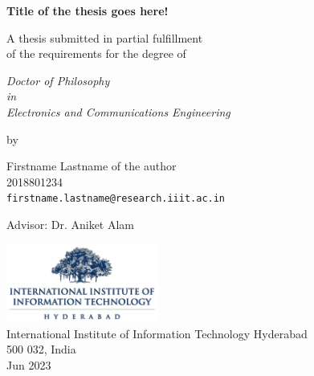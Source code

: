 \thispagestyle{empty}
\begin{center}
\vspace*{1.5cm}
{\Large \bf Title of the thesis goes here!}

\vspace*{2.2cm}
{\large A thesis submitted in partial fulfillment\\}
{\large  of the requirements for the degree of \\}

\vspace*{1cm}
{\it {\large Doctor of Philosophy } \\
{\large in\\}
{\large Electronics and Communications Engineering \\}}

\vspace*{0.8cm}
{\large by}

\vspace*{6mm}
{\large Firstname Lastname of the author\\}
{\large 2018801234\\
{\small \tt firstname.lastname@research.iiit.ac.in}}

\vspace*{5mm}
{\large Advisor: Dr. Aniket Alam\\}


\vspace*{3.0cm}
{\includegraphics[width=5cm]{figures/iiit.png}\\}
{\large International Institute of Information Technology Hyderabad\\}
{\large 500 032, India\\}
\vspace*{5mm}
{\large Jun 2023\\}
\end{center}